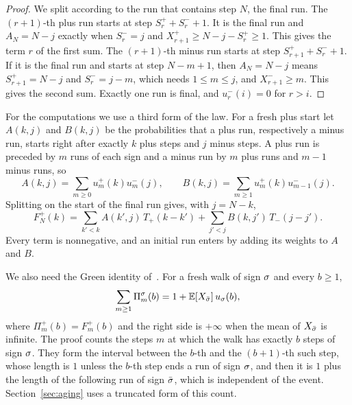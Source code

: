 \begin{proof}
We split according to the run that contains step $N$, the final run. The
$(r+1)$-th plus run starts at step $S^\plus_r+S^\minus_r+1$. It is the final run and
$A_N=N-j$ exactly when $S^\minus_r=j$ and $X^\plus_{r+1}\ge N-j-S^\plus_r\ge1$. This
gives the term $r$ of the first sum. The $(r+1)$-th minus run starts at step
$S^\plus_{r+1}+S^\minus_r+1$. If it is the final run and starts at step $N-m+1$, then
$A_N=N-j$ means $S^\plus_{r+1}=N-j$ and $S^\minus_r=j-m$, which needs $1\le m\le j$,
and $X^\minus_{r+1}\ge m$. This gives the second sum. Exactly one run is final, and
$u^\minus_r(i)=0$ for $r>i$.
\end{proof}

For the computations we use a third form of the law. For a fresh plus start let
$A(k,j)$ and $B(k,j)$ be the probabilities that a plus run, respectively a minus run,
starts right after exactly $k$ plus steps and $j$ minus steps. A plus run is preceded
by $m$ runs of each sign and a minus run by $m$ plus runs and $m-1$ minus runs, so
\[
 A(k,j)=\sum_{m\ge0}u^\plus_m(k)u^\minus_m(j),\qquad B(k,j)=\sum_{m\ge1}u^\plus_m(k)u^\minus_{m-1}(j).
\]
Splitting on the start of the final run gives, with $j=N-k$,
\begin{equation}\label{eq:run-sum}
 F^\plus_N(k)=\sum_{k'<k}A(k',j)\,T_\plus(k-k')+\sum_{j'<j}B(k,j')\,T_\minus(j-j').
\end{equation}
Every term is nonnegative, and an initial run enters by adding its weights to $A$ and
$B$.

We also need the Green identity of~\cite[Lemma~2.7]{paperF}. For a fresh walk of sign
$\sigma$ and every $b\ge1$,
\begin{equation}\label{eq:green}
 \sum_{m\ge1}\Pi^\sigma_m(b)=1+\mathbb{E}[X_{\bar\sigma}]\,u_\sigma(b),
\end{equation}
where $\Pi^\plus_m(b)=F^\plus_m(b)$ and the right side is $+\infty$ when the mean of
$X_{\bar\sigma}$ is infinite. The proof counts the steps $m$ at which the walk has exactly $b$
steps of sign $\sigma$. They form the interval between the $b$-th and the $(b+1)$-th such
step, whose length is $1$ unless the $b$-th step ends a run of sign $\sigma$, and then it is
$1$ plus the length of the following run of sign $\bar\sigma$, which is independent of the
event. Section~\ref{sec:aging} uses a truncated form of this count.
